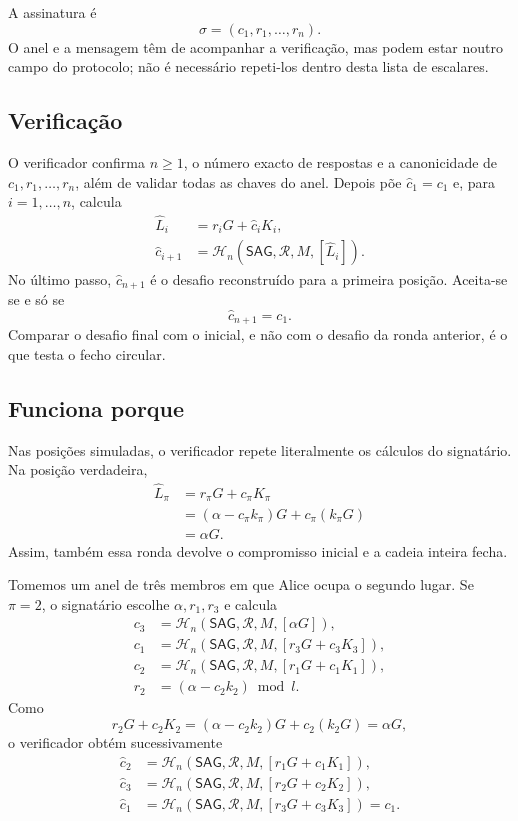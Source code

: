 A assinatura é
\[
\sigma=(c_1,r_1,\ldots,r_n).
\]
O anel e a mensagem têm de acompanhar a verificação, mas podem estar noutro
campo do protocolo; não é necessário repeti-los dentro desta lista de
escalares.

\subsection*{Verificação}

O verificador confirma \(n\geq1\), o número exacto de respostas e a
canonicidade de \(c_1,r_1,\ldots,r_n\), além de validar todas as chaves do
anel. Depois põe \(\widehat c_1=c_1\) e, para
\(i=1,\ldots,n\), calcula
\begin{align*}
\widehat L_i&=r_iG+\widehat c_iK_i,\\
\widehat c_{i+1}
  &=\mathcal H_n(\mathsf{SAG},\mathcal R,M,[\widehat L_i]).
\end{align*}
No último passo, \(\widehat c_{n+1}\) é o desafio reconstruído para a primeira
posição. Aceita-se se e só se
\[
\widehat c_{n+1}=c_1.
\]
Comparar o desafio final com o inicial, e não com o desafio da ronda
anterior, é o que testa o fecho circular.

\subsection*{Funciona porque}

Nas posições simuladas, o verificador repete literalmente os cálculos do
signatário. Na posição verdadeira,
\begin{align*}
\widehat L_\pi
  &=r_\pi G+c_\pi K_\pi\\
  &=(\alpha-c_\pi k_\pi)G+c_\pi(k_\pi G)\\
  &=\alpha G.
\end{align*}
Assim, também essa ronda devolve o compromisso inicial e a cadeia inteira
fecha.

Tomemos um anel de três membros em que Alice ocupa o segundo lugar.
Se \(\pi=2\), o signatário escolhe \(\alpha,r_1,r_3\) e calcula
\begin{align*}
c_3&=\mathcal H_n(\mathsf{SAG},\mathcal R,M,[\alpha G]),\\
c_1&=\mathcal H_n(\mathsf{SAG},\mathcal R,M,
                  [r_3G+c_3K_3]),\\
c_2&=\mathcal H_n(\mathsf{SAG},\mathcal R,M,
                  [r_1G+c_1K_1]),\\
r_2&=(\alpha-c_2k_2)\bmod l.
\end{align*}
Como
\[
r_2G+c_2K_2=(\alpha-c_2k_2)G+c_2(k_2G)=\alpha G,
\]
o verificador obtém sucessivamente
\begin{align*}
\widehat c_2&=\mathcal H_n(\mathsf{SAG},\mathcal R,M,
                           [r_1G+c_1K_1]),\\
\widehat c_3&=\mathcal H_n(\mathsf{SAG},\mathcal R,M,
                           [r_2G+\widehat c_2K_2]),\\
\widehat c_1&=\mathcal H_n(\mathsf{SAG},\mathcal R,M,
                           [r_3G+\widehat c_3K_3])=c_1.
\end{align*}

